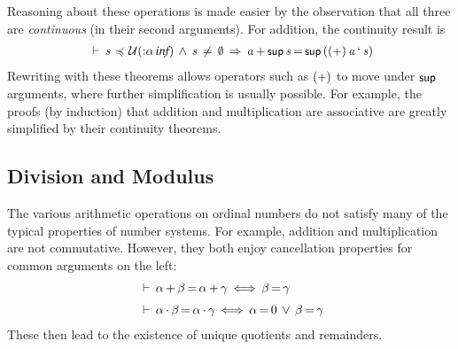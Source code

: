 \documentclass[11pt]{llncs}
\renewcommand{\HOLConst}[1]{{\textsf{\upshape\small #1}}}
\renewcommand{\HOLTyOp}[1]{\mbox{\fontencoding{T1}\fontfamily{bch}\fontseries{m}\fontshape{it}\fontsize{9.5}{10}\selectfont #1}}
\renewcommand{\HOLinline}[1]{\ensuremath{#1}}
\newcommand{\holthmenv}[1]{\begin{array}[t]{l}#1\end{array}}
\newenvironment{holmath}{\begin{displaymath}\begin{array}{l}}{\end{array}\end{displaymath}\ignorespacesafterend}
\begin{document}
Reasoning about these operations is made easier by the observation that all three are \emph{continuous} (in their second arguments).
For addition, the continuity result is
\begin{holmath}
\HOLTokenTurnstile{}\,\HOLFreeVar{s}\,\ensuremath{{\,\HOLTokenIsPrefix\,}}\,\ensuremath{\cal{U}}(\ensuremath{{:}}\ensuremath{\alpha}\,\HOLTyOp{inf})\,\HOLTokenConj{}\,\HOLFreeVar{s}\,\HOLTokenNotEqual{}\,\HOLConst{\HOLTokenEmpty{}}\,\HOLTokenImp{}\,\HOLFreeVar{a}\,\ensuremath{{+}}\,\HOLConst{sup}\,\HOLFreeVar{s}\,{\ensuremath{=}}\,\HOLConst{sup}\,((\HOLConst{\ensuremath{{+}}})\,\HOLFreeVar{a}\,\textrm{`}\,\HOLFreeVar{s})
\end{holmath}
Rewriting with these theorems allows operators such as \HOLinline{(\HOLConst{\ensuremath{{+}}})} to move under \HOLinline{\HOLConst{sup}} arguments, where further simplification is usually possible.
For example, the proofs (by induction) that addition and multiplication are associative are greatly simplified by their continuity theorems.

\subsection{Division and Modulus}
The various arithmetic operations on ordinal numbers do not satisfy many of the typical properties of number systems.
For example, addition and multiplication are not commutative.
However, they both enjoy cancellation properties for common arguments on the left:
\[
\begin{array}{l}
\holthmenv{\HOLTokenTurnstile{}\,\HOLFreeVar{\ensuremath{\alpha}}\,\ensuremath{{+}}\,\HOLFreeVar{\ensuremath{\beta}}\,{\ensuremath{=}}\,\HOLFreeVar{\ensuremath{\alpha}}\,\ensuremath{{+}}\,\HOLFreeVar{\ensuremath{\gamma}}\,\ensuremath{{\iff}}\,\HOLFreeVar{\ensuremath{\beta}}\,{\ensuremath{=}}\,\HOLFreeVar{\ensuremath{\gamma}}} \\[2mm]
\holthmenv{\HOLTokenTurnstile{}\,\HOLFreeVar{\ensuremath{\alpha}}\,\ensuremath{{\cdot}}\,\HOLFreeVar{\ensuremath{\beta}}\,{\ensuremath{=}}\,\HOLFreeVar{\ensuremath{\alpha}}\,\ensuremath{{\cdot}}\,\HOLFreeVar{\ensuremath{\gamma}}\,\ensuremath{{\iff}}\,\HOLFreeVar{\ensuremath{\alpha}}\,{\ensuremath{=}}\,0\,\HOLTokenDisj{}\,\HOLFreeVar{\ensuremath{\beta}}\,{\ensuremath{=}}\,\HOLFreeVar{\ensuremath{\gamma}}}
\end{array}
\]
These then lead to the existence of unique quotients and remainders.
\end{document}
